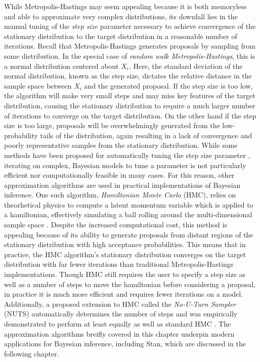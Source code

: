 \documentclass[
  12pt,
]{book}
\theoremstyle{definition}
\theoremstyle{definition}
\theoremstyle{definition}
\theoremstyle{remark}
\begin{document}
While Metropolis-Hastings may seem appealing because it is both memoryless and able to approximate very complex distributions, its downfall lies in the manual tuning of the \emph{step size} parameter necessary to achieve convergence of the stationary distribution to the target distribution in a reasonable number of iterations.
Recall that Metropolis-Hastings generates proposals by sampling from some distribution.
In the special case of \emph{random walk Metropolis-Hastings}, this is a normal distribution centered about \(X_{i}\).
Here, the standard deviation of the normal distribution, known as the step size, dictates the relative distance in the sample space between \(X_{i}\) and the generated proposal.
If the step size is too low, the algorithm will make very small steps and may miss key features of the target distribution, causing the stationary distribution to require a much larger number of iterations to converge on the target distribution.
On the other hand if the step size is too large, proposals will be overwhelmingly generated from the low-probability tails of the distribution, again resulting in a lack of convergence and poorly representative samples from the stationary distribution.
While some methods have been proposed for automatically tuning the step size parameter \citep{Graves2011}, iterating on complex, Bayesian models to tune a parameter is not particularly efficient nor computationally feasible in many cases.
For this reason, other approximation algorithms are used in practical implementations of Bayesian inference.
One such algorithm, \emph{Hamiltonian Monte Carlo} (HMC), relies on theorhetical physics to compute a latent momentum variable which is applied to a hamiltonian, effectively simulating a ball rolling around the multi-dimensional sample space \citep{Brooks2011}.
Despite the increased computational cost, this method is appealing because of its ability to generate proposals from distant regions of the stationary distribution with high acceptance probabilities.
This means that in practice, the HMC algorithm's stationary distribution converges on the target distribution with far fewer iterations than traditional Metropolis-Hastings implementations.
Though HMC still requires the user to specify a step size as well as a number of steps to move the hamiltonian before considering a proposal, in practice it is much more efficient and requires fewer iterations on a model.
Additionally, a proposed extension to HMC called the \emph{No-U-Turn Sampler} (NUTS) automatically determines the number of steps and was empirically demonstrated to perform at least equally as well as standard HMC \citep{Homan2014}.
The approximation algorithms breifly covered in this chapter underpin modern applications for Bayesian inference, including Stan, which are discussed in the following chapter.
\end{document}
